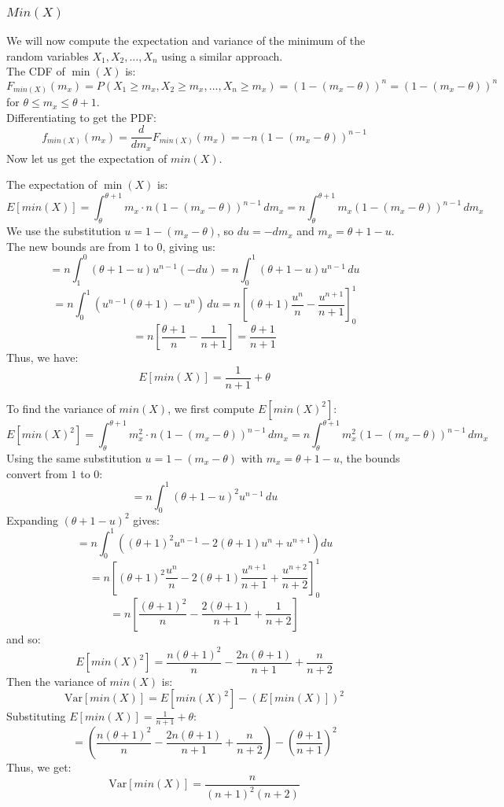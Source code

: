 \documentclass[12pt]{article}
\begin{document}
\subsubsection*{\underline{$Min(X)$}}
We will now compute the expectation and variance of the minimum of the random variables \(X_1, X_2, \ldots, X_n\) using a similar approach.\\
The CDF of \(\min(X)\) is:
\[
F_{min(X)}(m_x) = P(X_1 \geq m_x, X_2 \geq m_x, \ldots, X_n \geq m_x) = (1 - (m_x - \theta))^n = (1 - (m_x - \theta))^n
\]
for \(\theta \leq m_x \leq \theta + 1\). \\ 
Differentiating to get the PDF:
\[
f_{min(X)}(m_x) = \frac{d}{dm_x}F_{min(X)}(m_x) = -n(1 - (m_x - \theta))^{n-1}
\]
Now let us get the expectation of \(min(X)\).

The expectation of \(\min(X)\) is:
\[
E[min(X)] = \int_{\theta}^{\theta+1} m_x \cdot n (1 - (m_x - \theta))^{n-1} \, dm_x = n \int_{\theta}^{\theta+1} m_x (1 - (m_x - \theta))^{n-1} \, dm_x
\]
We use the substitution \(u = 1 - (m_x - \theta)\), so \(du = -dm_x\) and \(m_x = \theta + 1 - u\). The new bounds are from \(1\) to \(0\), giving us:
\[
= n \int_{1}^{0} (\theta + 1 - u) u^{n-1} (-du) = n \int_{0}^{1} (\theta + 1 - u) u^{n-1} \, du
\]
\[
= n \int_{0}^{1} (u^{n-1}(\theta + 1) - u^n) \, du = n \left[ (\theta + 1) \frac{u^n}{n} - \frac{u^{n+1}}{n+1} \right]_{0}^{1} 
\]
\[
= n \left[ \frac{\theta + 1}{n} - \frac{1}{n+1} \right] = \frac{\theta + 1}{n+1}
\]
Thus, we have:
\[
E[min(X)] = \frac{ 1}{n+1} + \theta
\]



To find the variance of \(min(X)\), we first compute \(E[min(X)^2]\):
\[
E[min(X)^2] = \int_{\theta}^{\theta+1} m_x^2 \cdot n (1 - (m_x - \theta))^{n-1} \, dm_x = n \int_{\theta}^{\theta+1} m_x^2 (1 - (m_x - \theta))^{n-1} \, dm_x
\]
Using the same substitution \(u = 1 - (m_x - \theta)\) with \(m_x = \theta + 1 - u\), the bounds convert from \(1\) to \(0\):
\[
= n \int_{0}^{1} (\theta + 1 - u)^2 u^{n-1} \, du
\]
Expanding \((\theta + 1 - u)^2\) gives:
\[
= n \int_{0}^{1} \left( (\theta + 1)^2 u^{n-1} - 2(\theta + 1) u^n + u^{n+1} \right) du
\]
\[
= n \left[ (\theta + 1)^2 \frac{u^n}{n} - 2(\theta + 1) \frac{u^{n+1}}{n+1} + \frac{u^{n+2}}{n+2} \right]_{0}^{1}
\]
\[
= n \left[ \frac{(\theta + 1)^2}{n} - \frac{2(\theta + 1)}{n+1} + \frac{1}{n+2} \right]
\]
and so:
\[
E[min(X)^2] = \frac{n(\theta + 1)^2}{n} - \frac{2n(\theta + 1)}{n+1} + \frac{n}{n+2}
\]
Then the variance of \(min(X)\) is:
\[
\text{Var}[min(X)] = E[min(X)^2] - (E[min(X)])^2
\]
Substituting \(E[min(X)] = \frac{1}{n+1}+\theta\):
\[
= \left(\frac{n(\theta + 1)^2}{n} - \frac{2n(\theta + 1)}{n+1} + \frac{n}{n+2}\right) - \left(\frac{\theta + 1}{n+1}\right)^2
\]
Thus, we get:
\[
\text{Var}[min(X)] = \frac{n}{(n+1)^2(n+2)}
\]
\end{document}

